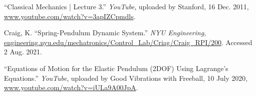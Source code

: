 \begin{thebibliography}{99}


“Classical Mechanics | Lecture 3.” \emph{YouTube}, uploaded by Stanford, 16 Dec. 2011, \url{www.youtube.com/watch?v=3apIZCpmdls}.

Craig, K. “Spring-Pendulum Dynamic System.” \emph{NYU Engineering}, \url{engineering.nyu.edu/mechatronics/Control\_Lab/Criag/Craig\_RPI/200}. Accessed 2 Aug. 2021.




“Equations of Motion for the Elastic Pendulum (2DOF) Using Lagrange’s Equations.” \emph{YouTube}, uploaded by Good Vibrations with Freeball, 10 July 2020, \url{www.youtube.com/watch?v=iULa9A00JpA}.






\end{thebibliography}
